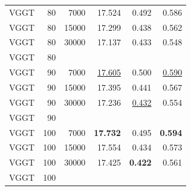 \begin{table}[H]
\begin{tabular}{lrrrrr}
VGGT & 80 & 7000 & 17.524 & 0.492 & 0.586 \\
VGGT & 80 & 15000 & 17.299 & 0.438 & 0.562 \\
VGGT & 80 & 30000 & 17.137 & 0.433 & 0.548 \\
VGGT & 80 &  &  &  &  \\
VGGT & 90 & 7000 & \underline{17.605} & 0.500 & \underline{0.590} \\
VGGT & 90 & 15000 & 17.395 & 0.441 & 0.567 \\
VGGT & 90 & 30000 & 17.236 & \underline{0.432} & 0.554 \\
VGGT & 90 &  &  &  &  \\
VGGT & 100 & 7000 & \textbf{17.732} & 0.495 & \textbf{0.594} \\
VGGT & 100 & 15000 & 17.554 & 0.434 & 0.573 \\
VGGT & 100 & 30000 & 17.425 & \textbf{0.422} & 0.561 \\
VGGT & 100 &  &  &  &  \\
\bottomrule
\end{tabular}
\end{table}
